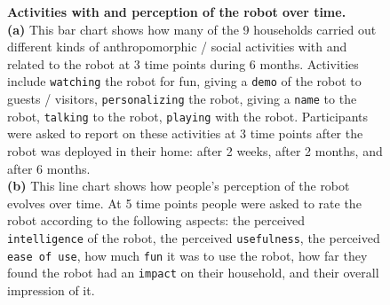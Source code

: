 \documentclass{frontiersSCNS} %
\begin{document}
\begin{figure}[t]
	\centering
    
    
    \caption{\textbf{Activities with and perception of the robot over time.}\\
	\textbf{(a)} This bar chart shows how many of the 9 households carried out different kinds of anthropomorphic / social activities with and related to the robot at 3 time points during 6 months. Activities include \texttt{watching} the robot for fun, giving a \texttt{demo} of the robot to guests / visitors, \texttt{personalizing} the robot, giving a \texttt{name} to the robot, \texttt{talking} to the robot, \texttt{playing} with the robot. Participants were asked to report on these activities at 3 time points after the robot was deployed in their home: after 2 weeks, after 2 months, and after 6 months.\\
	\textbf{(b)} This line chart shows how people's perception of the robot evolves over time. At 5 time points people were asked to rate the robot according to the following aspects: the perceived \texttt{intelligence} of the robot, the perceived \texttt{usefulness}, the perceived \texttt{ease of use}, how much \texttt{fun} it was to use the robot, how far they found the robot had an \texttt{impact} on their household, and their {overall} impression of it.}

\end{figure}
\end{document}
